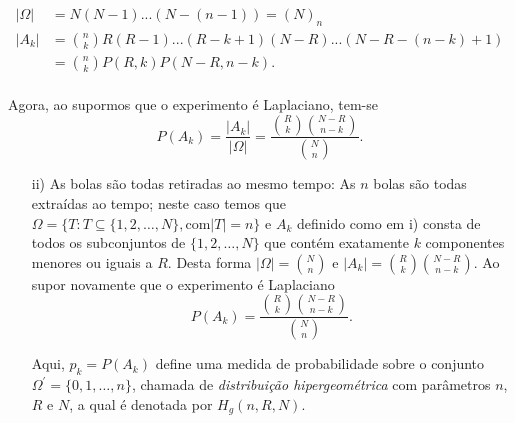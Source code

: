 \begin{frame}
\begin{block}{}
	\begin{equation*}\displaystyle
	\begin{aligned}
	\left| \Omega \right| &=  N(N-1)...(N-(n-1))=(N)_n \\
	\left| A_k \right| &= \binom{n}{k} R(R-1) ... (R-k+1)(N-R)...(N-R-(n-k)+1) \\
	&=\binom{n}{k}P(R,k) P(N-R, n-k). \\
	\end{aligned}
	\end{equation*}
	
Agora, ao supormos que o experimento é Laplaciano, tem-se
\begin{equation*}
P(A_k)=\frac{\left|A_k \right|}{ \left|\Omega\right|}= \displaystyle{\frac{\binom{R}{k} \binom{N-R}{n-k} }{ \binom{N}{n}}} .
\end{equation*}
\begin{enumerate}
\item[ii)] As bolas são todas retiradas ao mesmo tempo: As $n$ bolas são todas extraídas ao tempo; neste caso temos que 
$\Omega =\{T:T \subseteq\{1,2,\ldots,N \}, \text{com}  \left|T\right|=n\}$ e $A_k$ definido como em i) consta de
todos os subconjuntos de  $\{1,2,  \dots ,N\}$ que contém  exatamente $k$ componentes menores ou iguais a $R$. Desta
forma  $\left| \Omega\right|= \binom{N}{n} $  e $\left| A_k\right|= \binom{R}{k} \binom{N-R}{n-k}.$ Ao supor novamente que o experimento é Laplaciano 
\begin{equation*} 
\displaystyle{P(A_k)=\frac{\binom{R}{k} \binom{N-R}{n-k} } { \binom{N}{n}}}.
\end{equation*}

Aqui, $p_k=P(A_k)$ define uma medida de probabilidade sobre o conjunto $\Omega^\prime=\{0,1, \dots  , n\} $, chamada de \textit{distribuição
hipergeométrica} com parâmetros $n$, $R$ e $N$, a qual é denotada por $H_g (n,R,N)$. 
\end{enumerate}
\end{block}
\end{frame}

